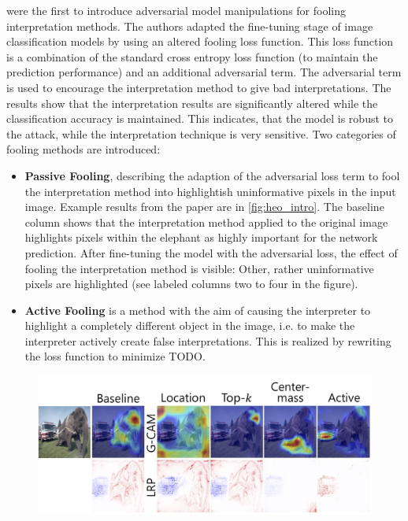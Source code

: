 \newline
\cite{fooling_nn_interpreters} were the first to introduce adversarial model manipulations for fooling interpretation methods. The authors adapted the fine-tuning stage of image classification models by using an altered fooling loss function. This loss function is a combination of the standard cross entropy loss function (to maintain the prediction performance) and an additional adversarial term. The adversarial term is used to encourage the interpretation method to give bad interpretations. The results show that the interpretation results are significantly altered while the classification accuracy is maintained. 
This indicates, that the model is robust to the attack, while the interpretation technique is very sensitive. 
Two categories of fooling methods are introduced: 
\begin{itemize}
    \item \textbf{Passive Fooling}, describing the adaption of the adversarial loss term to fool the interpretation method into highlightish uninformative pixels in the input image. Example results from the paper are in \autoref{fig:heo_intro}. The baseline column shows that the interpretation method applied to the original image highlights pixels within the elephant as highly important for the network prediction. After fine-tuning the model with the adversarial loss, the effect of fooling the interpretation method is visible: Other, rather uninformative pixels are highlighted (see labeled columns two to four in the figure). 
    \item \textbf{Active Fooling} is a method with the aim of causing the interpreter to highlight a completely different object in the image, i.e. to make the interpreter actively create false interpretations. This is realized by rewriting the loss function to minimize TODO.
\end{itemize}

\begin{figure}[ht]
    \centering
    \includegraphics[width=\linewidth]{figures/heo_intro.jpg}
    \caption{}
    \label{fig:heo_intro}
    \vspace{-0.3cm}
\end{figure}

